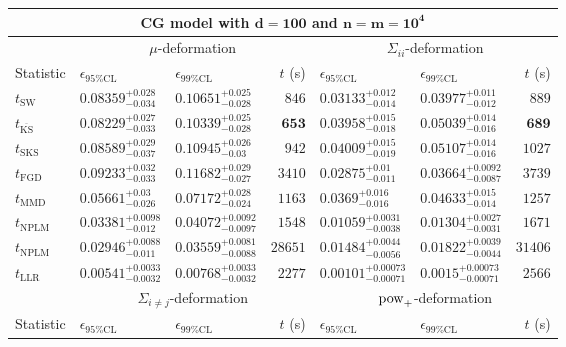 \begin{tabular}{l|llr|llr}
	\toprule
	\multicolumn{7}{c}{{\bf CG model with $\mathbf{d=100}$ and $\mathbf{n=m=10^{4}}$}} \\
	\toprule
	\multicolumn{1}{c}{} & \multicolumn{3}{c}{$\mu$-deformation} & \multicolumn{3}{c}{$\Sigma_{ii}$-deformation} \\
	Statistic & $\epsilon_{95\%\mathrm{CL}}$ & $\epsilon_{99\%\mathrm{CL}}$ & $t$ (s) & $\epsilon_{95\%\mathrm{CL}}$ & $\epsilon_{99\%\mathrm{CL}}$ & $t$ (s) \\
	\midrule
	$t_{\mathrm{SW}}$ & $0.08359_{-0.034}^{+0.028}$ & $0.10651_{-0.028}^{+0.025}$ & $846$ & $0.03133_{-0.014}^{+0.012}$ & $0.03977_{-0.012}^{+0.011}$ & $889$ \\
	$t_{\overline{\mathrm{KS}}}$ & $0.08229_{-0.033}^{+0.027}$ & $0.10339_{-0.028}^{+0.025}$ & ${\mathbf{653}}$ & $0.03958_{-0.018}^{+0.015}$ & $0.05039_{-0.016}^{+0.014}$ & ${\mathbf{689}}$ \\
	$t_{\mathrm{SKS}}$ & $0.08589_{-0.037}^{+0.029}$ & $0.10945_{-0.03}^{+0.026}$ & $942$ & $0.04009_{-0.019}^{+0.015}$ & $0.05107_{-0.016}^{+0.014}$ & $1027$ \\
	$t_{\mathrm{FGD}}$ & $0.09233_{-0.033}^{+0.032}$ & $0.11682_{-0.027}^{+0.029}$ & $3410$ & ${\mathbf{0.02875_{-0.011}^{+0.01}}}$ & ${\mathbf{0.03664_{-0.0087}^{+0.0092}}}$ & $3739$ \\
	$t_{\mathrm{MMD}}$ & ${\mathbf{0.05661_{-0.026}^{+0.03}}}$ & ${\mathbf{0.07172_{-0.024}^{+0.028}}}$ & $1163$ & $0.0369_{-0.016}^{+0.016}$ & $0.04633_{-0.014}^{+0.015}$ & $1257$ \\
\rowcolor{red!35}	$t_{\mathrm{NPLM}}$ & $0.03381_{-0.012}^{+0.0098}$ & $0.04072_{-0.0097}^{+0.0092}$ & $1548$ & $0.01059_{-0.0038}^{+0.0031}$ & $0.01304_{-0.0031}^{+0.0027}$ & $1671$ \\
\rowcolor{blue!35}	$t_{\mathrm{NPLM}}$ & $0.02946_{-0.011}^{+0.0088}$ & $0.03559_{-0.0088}^{+0.0081}$ & $28651$ & $0.01484_{-0.0056}^{+0.0044}$ & $0.01822_{-0.0044}^{+0.0039}$ & $31406$ \\
	$t_{\mathrm{LLR}}$ & $0.00541_{-0.0032}^{+0.0033}$ & $0.00768_{-0.0032}^{+0.0033}$ & $2277$ & $0.00101_{-0.00071}^{+0.00073}$ & $0.0015_{-0.00071}^{+0.00073}$ & $2566$ \\
	\toprule
	\multicolumn{1}{c}{} & \multicolumn{3}{c}{$\Sigma_{i\neq j}$-deformation} & \multicolumn{3}{c}{$\rm{pow}_{+}$-deformation} \\
	Statistic & $\epsilon_{95\%\mathrm{CL}}$ & $\epsilon_{99\%\mathrm{CL}}$ & $t$ (s) & $\epsilon_{95\%\mathrm{CL}}$ & $\epsilon_{99\%\mathrm{CL}}$ & $t$ (s) \\

\end{tabular}
